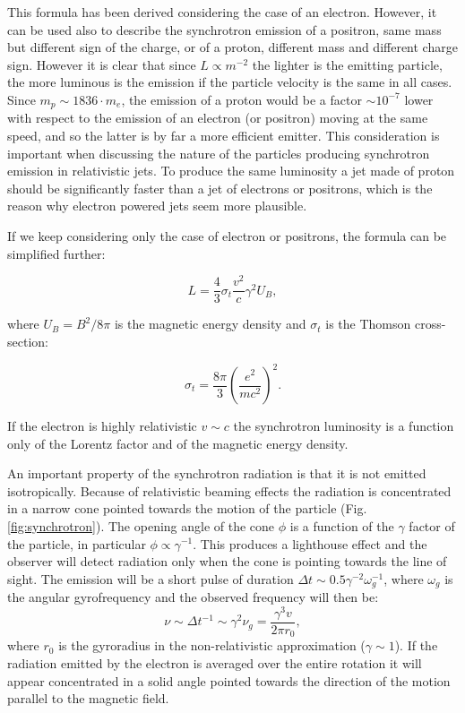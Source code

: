 \documentclass[../main.tex]{subfiles}
\begin{document}
This formula has been derived considering the case of an electron. 
However, it can be used also to describe the synchrotron emission of a positron, same mass but different sign of the charge, or of a proton, different mass and different charge sign.
However it is clear that since $L\propto m^{-2}$ the lighter is the emitting particle, the more luminous is the emission if the particle velocity is the same in all cases.
Since $m_p \sim 1836\cdot m_e$, the emission of a proton would be a factor $\sim 10^{-7}$ lower with respect to the emission of an electron (or positron) moving at the same speed, and so the latter is by far a more efficient emitter.
This consideration is important when discussing the nature of the particles producing synchrotron emission in relativistic jets.
To produce the same luminosity a jet made of proton should be significantly faster than a jet of electrons or positrons, which is the reason why electron powered jets seem more plausible.

If we keep considering only the case of electron or positrons, the formula can be simplified further:

\begin{equation}
    \label{eq:sync_semp}
    L=\frac{4}{3}\sigma_t\frac{v^2}{c}\gamma^2U_B,
\end{equation}

where $U_B = B^2/8\pi$ is the magnetic energy density and $\sigma_t$ is the Thomson cross-section:

\begin{equation}
    \label{eq:thomson}
    \sigma_t = \frac{8\pi}{3}\left(\frac{e^2}{mc^2}\right)^2.
\end{equation}

If the electron is highly relativistic $v\sim c$ the synchrotron luminosity is a function only of the Lorentz factor and of the magnetic energy density.

An important property of the synchrotron radiation is that it is not emitted isotropically.
Because of relativistic beaming effects the radiation is concentrated in a narrow cone pointed towards the motion of the particle (Fig.\,\ref{fig:synchrotron}).
The opening angle of the cone $\phi$ is a function of the $\gamma$ factor of the particle, in particular $\phi \propto \gamma^{-1}$.
This produces a lighthouse effect and the observer will detect radiation only when the cone is pointing towards the line of sight.
The emission will be a short pulse of duration $\Delta t \sim 0.5\gamma^{-2} \omega_g^{-1}$, where $\omega_g$ is the angular gyrofrequency and the observed frequency will then be:
\begin{equation}
    \label{eq:new_freq}
    \nu \sim \Delta t^{-1} \sim \gamma^2\nu_g = \frac{\gamma^3v}{2\pi r_0},
\end{equation}
where $r_0$ is the gyroradius in the non-relativistic approximation ($\gamma \sim 1$).
If the radiation emitted by the electron is averaged over the entire rotation it will appear concentrated in a solid angle pointed towards the direction of the motion parallel to the magnetic field.
\end{document}
